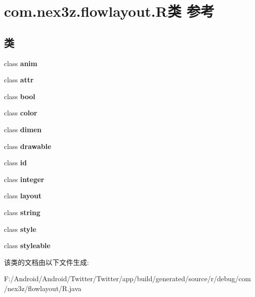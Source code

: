 \hypertarget{classcom_1_1nex3z_1_1flowlayout_1_1_r}{}\section{com.\+nex3z.\+flowlayout.\+R类 参考}
\label{classcom_1_1nex3z_1_1flowlayout_1_1_r}
\subsection*{类}
\begin{DoxyCompactItemize}
\item 
class {\bfseries anim}
\item 
class {\bfseries attr}
\item 
class {\bfseries bool}
\item 
class {\bfseries color}
\item 
class {\bfseries dimen}
\item 
class {\bfseries drawable}
\item 
class {\bfseries id}
\item 
class {\bfseries integer}
\item 
class {\bfseries layout}
\item 
class {\bfseries string}
\item 
class {\bfseries style}
\item 
class {\bfseries styleable}
\end{DoxyCompactItemize}


该类的文档由以下文件生成\+:\begin{DoxyCompactItemize}
\item 
F\+:/\+Android/\+Android/\+Twitter/\+Twitter/app/build/generated/source/r/debug/com/nex3z/flowlayout/R.\+java\end{DoxyCompactItemize}
